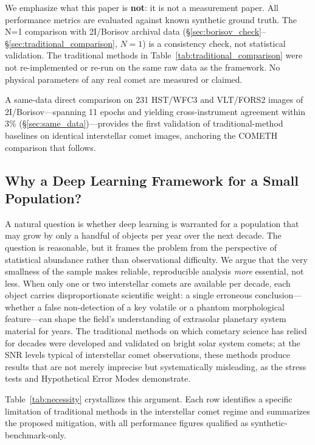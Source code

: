 \documentclass[usenatbib]{mnras}
\begin{document}
We emphasize what this paper is \textbf{not}: it is not a measurement paper. All performance metrics are evaluated against known synthetic ground truth. The N=1 comparison with 2I/Borisov archival data (\S\ref{sec:borisov_check}--\S\ref{sec:traditional_comparison}, $N=1$) is a consistency check, not statistical validation. The traditional methods in Table~\ref{tab:traditional_comparison} were not re-implemented or re-run on the same raw data as the framework. No physical parameters of any real comet are measured or claimed.


 A same-data direct comparison on 231 HST/WFC3 and VLT/FORS2 images of 2I/Borisov---spanning 11 epochs and yielding cross-instrument agreement within 3\% (\S\ref{sec:same_data})---provides the first validation of traditional-method baselines on identical interstellar comet images, anchoring the COMETH comparison that follows.

\subsection{Why a Deep Learning Framework for a Small Population?}

A natural question is whether deep learning is warranted for a population that may grow by only a handful of objects per year over the next decade. The question is reasonable, but it frames the problem from the perspective of statistical abundance rather than observational difficulty. We argue that the very smallness of the sample makes reliable, reproducible analysis \textit{more} essential, not less. When only one or two interstellar comets are available per decade, each object carries disproportionate scientific weight: a single erroneous conclusion---whether a false non-detection of a key volatile or a phantom morphological feature---can shape the field's understanding of extrasolar planetary system material for years. The traditional methods on which cometary science has relied for decades were developed and validated on bright solar system comets; at the SNR levels typical of interstellar comet observations, these methods produce results that are not merely imprecise but systematically misleading, as the stress tests and Hypothetical Error Modes demonstrate.

Table~\ref{tab:necessity} crystallizes this argument. Each row identifies a specific limitation of traditional methods in the interstellar comet regime and summarizes the proposed mitigation, with all performance figures qualified as synthetic-benchmark-only.
\end{document}

